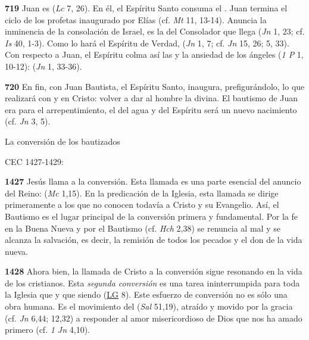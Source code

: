 \begin{body}
\begin{body}
\textbf{719} Juan es  (\emph{Lc} 7, 26). En él, el Espíritu Santo consuma el . Juan termina el ciclo de los profetas inaugurado por Elías (cf. \emph{Mt} 11, 13-14). Anuncia la inminencia de la consolación de Israel, es la  del Consolador que llega (\emph{Jn} 1, 23; cf. \emph{Is} 40, 1-3). Como lo hará el Espíritu de Verdad,  (\emph{Jn} 1, 7; cf. \emph{Jn} 15, 26; 5, 33). Con respecto a Juan, el Espíritu colma así las  y la ansiedad de los ángeles (\emph{1 P} 1, 10-12):  (\emph{Jn} 1, 33-36).

\textbf{720} En fin, con Juan Bautista, el Espíritu Santo, inaugura, prefigurándolo, lo que realizará con y en Cristo: volver a dar al hombre la  divina. El bautismo de Juan era para el arrepentimiento, el del agua y del Espíritu será un nuevo nacimiento (cf. \emph{Jn} 3, 5).

La conversión de los bautizados

CEC 1427-1429:

\textbf{1427} Jesús llama a la conversión. Esta llamada es una parte esencial del anuncio del Reino:  (\emph{Mc} 1,15). En la predicación de la Iglesia, esta llamada se dirige primeramente a los que no conocen todavía a Cristo y su Evangelio. Así, el Bautismo es el lugar principal de la conversión primera y fundamental. Por la fe en la Buena Nueva y por el Bautismo (cf. \emph{Hch} 2,38) se renuncia al mal y se alcanza la salvación, es decir, la remisión de todos los pecados y el don de la vida nueva.

\textbf{1428} Ahora bien, la llamada de Cristo a la conversión sigue resonando en la vida de los cristianos. Esta \emph{segunda conversión} es una tarea ininterrumpida para toda la Iglesia que  y que siendo  (\href{http://www.vatican.va/archive/hist_councils/ii_vatican_council/documents/vat-ii_const_19641121_lumen-gentium_sp.html}{LG} 8). Este esfuerzo de conversión no es sólo una obra humana. Es el movimiento del  (\emph{Sal} 51,19), atraído y movido por la gracia (cf. \emph{Jn} 6,44; 12,32) a responder al amor misericordioso de Dios que nos ha amado primero (cf. \emph{1 Jn} 4,10).


\end{body}
\end{body}
